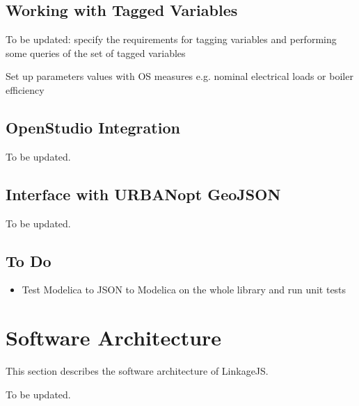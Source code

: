 \documentclass[letterpaper,10pt, openany,english]{sphinxmanual}
\begin{document}
\section{Working with Tagged Variables}
\label{\detokenize{requirements:working-with-tagged-variables}}\label{\detokenize{requirements:par-tagged-variables}}
To be updated: specify the requirements for tagging variables and performing some queries of the set of tagged variables

Set up parameters values with OS measures e.g. nominal electrical loads or boiler efficiency


\section{OpenStudio Integration}
\label{\detokenize{requirements:openstudio-integration}}
To be updated.


\section{Interface with URBANopt GeoJSON}
\label{\detokenize{requirements:interface-with-urbanopt-geojson}}
To be updated.


\section{To Do}
\label{\detokenize{requirements:to-do}}\begin{itemize}
\item {} 
Test Modelica to JSON to Modelica on the whole library and run unit tests

\end{itemize}


\chapter{Software Architecture}
\label{\detokenize{architecture:software-architecture}}\label{\detokenize{architecture:sec-architecture}}\label{\detokenize{architecture::doc}}
This section describes the software architecture of LinkageJS.

To be updated.
\end{document}

